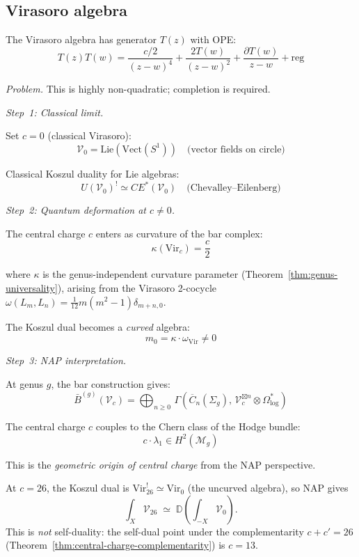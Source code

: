 \subsection{Virasoro algebra}

\begin{example}\label{ex:virasoro-NAP}
The Virasoro algebra has generator $T(z)$ with OPE:
\[T(z) T(w) = \frac{c/2}{(z-w)^4} + \frac{2T(w)}{(z-w)^2} + \frac{\partial T(w)}{z-w} + \text{reg}\]

\emph{Problem.} This is highly non-quadratic; completion is required.

\emph{Step~1: Classical limit.}

Set $c = 0$ (classical Virasoro):
\[\mathcal{V}_0 = \text{Lie}(\text{Vect}(S^1)) \quad \text{(vector fields on circle)}\]

Classical Koszul duality for Lie algebras:
\[U(\mathcal{V}_0)^! \simeq CE^*(\mathcal{V}_0) \quad \text{(Chevalley--Eilenberg)}\]

\emph{Step~2: Quantum deformation at $c \neq 0$.}

The central charge $c$ enters as curvature of the bar complex:
\[\kappa(\text{Vir}_c) = \frac{c}{2}\]

where $\kappa$ is the genus-independent curvature parameter (Theorem~\ref{thm:genus-universality}), arising from the Virasoro 2-cocycle $\omega(L_m, L_n) = \frac{1}{12}m(m^2-1)\delta_{m+n,0}$.

The Koszul dual becomes a \emph{curved} algebra:
\[m_0 = \kappa \cdot \omega_{\text{Vir}} \neq 0\]

\emph{Step~3: NAP interpretation.}

At genus $g$, the bar construction gives:
\[\bar{B}^{(g)}(\mathcal{V}_c) = \bigoplus_{n \geq 0}\, \Gamma\!\left(\overline{C}_n(\Sigma_g),\, \mathcal{V}_c^{\boxtimes n} \otimes \Omega^*_{\log}\right)\]

The central charge $c$ couples to the Chern class of the Hodge bundle:
\[c \cdot \lambda_1 \in H^2(\mathcal{M}_g)\]

This is the \emph{geometric origin of central charge} from the NAP perspective.

\begin{proposition}[Virasoro NAP duality at \texorpdfstring{$c=26$}{c=26};
\ClaimStatusProvedHere]\label{prop:virasoro-c26-selfdual}
At $c = 26$, the Koszul dual is $\mathrm{Vir}_{26}^! \simeq \mathrm{Vir}_0$
(the uncurved algebra), so NAP gives
\[
\int_X \mathcal{V}_{26}
\;\simeq\;
\mathbb{D}\!\left(\int_{-X} \mathcal{V}_0\right).
\]
This is \emph{not} self-duality: the self-dual point under
the complementarity $c + c' = 26$
(Theorem~\textup{\ref{thm:central-charge-complementarity}})
is $c = 13$.
\end{proposition}


\end{example}
